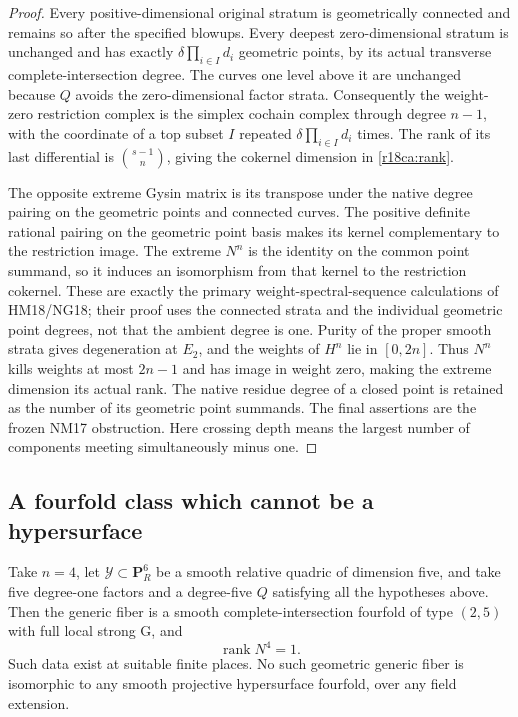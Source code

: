 \begin{proof}
Every positive-dimensional original stratum is geometrically
connected and remains so after the specified blowups.
Every deepest zero-dimensional stratum is unchanged and
has exactly $\delta\prod_{i\in I}d_i$ geometric points,
by its actual transverse complete-intersection degree.
The curves one level above it are unchanged because $Q$
avoids the zero-dimensional factor strata.
Consequently the weight-zero restriction complex is the
simplex cochain complex through degree $n-1$, with
the coordinate of a top subset $I$ repeated
$\delta\prod_{i\in I}d_i$ times.
The rank of its last differential is $\binom{s-1}{n}$,
giving the cokernel dimension in \eqref{r18ca:rank}.

The opposite extreme Gysin matrix is its transpose under
the native degree pairing on the geometric points and
connected curves.  The positive definite rational pairing
on the geometric point basis makes its kernel complementary
to the restriction image.  The extreme $N^n$ is the
identity on the common point summand, so it induces an
isomorphism from that kernel to the restriction cokernel.
These are exactly the primary weight-spectral-sequence
calculations of HM18/NG18; their proof uses the connected
strata and the individual geometric point degrees, not
that the ambient degree is one.
Purity of the proper smooth strata gives degeneration
at $E_2$, and the weights of $H^n$ lie in $[0,2n]$.
Thus $N^n$ kills weights at most $2n-1$ and has image
in weight zero, making the extreme dimension its actual
rank.  The native residue degree of a closed point is
retained as the number of its geometric point summands.
The final assertions are the frozen NM17 obstruction.
Here crossing depth means the largest number of components
meeting simultaneously minus one.
\end{proof}

\subsection{A fourfold class which cannot be a hypersurface}

\begin{corollary}
\label{r18ca:quadric-example}
Take $n=4$, let $\mathcal Y\subset\mathbf P_R^6$ be a
smooth relative quadric of dimension five, and take five
degree-one factors and a degree-five $Q$ satisfying all
the hypotheses above.  Then the generic fiber is a smooth
complete-intersection fourfold of type $(2,5)$ with full
local strong G, and
\[
                         \operatorname{rank}N^4=1.
 \tag{CA18.10}\label{r18ca:quadric-rank}
\]
Such data exist at suitable finite places.  No such
geometric generic fiber is isomorphic to any smooth
projective hypersurface fourfold, over any field extension.
\end{corollary}

